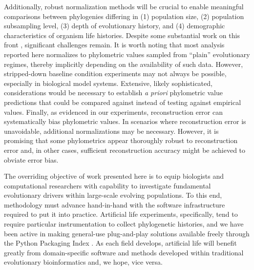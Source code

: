 Additionally, robust normalization methods will be crucial to enable meaningful comparisons between phylogenies differing in (1) population size, (2) population subsampling level, (3) depth of evolutionary history, and (4) demographic characteristics of organism life histories.
Despite some substantial work on this front \citep{shao1990tree,mir2018sound}, significant challenges remain.
It is worth noting that most analysis reported here normalizes to phylometric values sampled from ``plain'' evolutionary regimes, thereby implicitly depending on the availability of such data.
However, stripped-down baseline condition experiments may not always be possible, especially in biological model systems.
Extensive, likely sophisticated, considerations would be necessary to establish \textit{a priori} phylometric value predictions that could be compared against instead of testing against empirical values.
Finally, as evidenced in our experiments, reconstruction error can systematically bias phylometric values.
In scenarios where reconstruction error is unavoidable, additional normalizations may be necessary.
However, it is promising that some phylometrics appear thoroughly robust to reconstruction error and, in other cases, sufficient reconstruction accuracy might be achieved to obviate error bias.

The overriding objective of work presented here is to equip biologists and computational researchers with capability to investigate fundamental evolutionary drivers within large-scale evolving populations.
To this end, methodology must advance hand-in-hand with the software infrastructure required to put it into practice.
Artificial life experiments, specifically, tend to require particular instrumentation to collect phylogenetic histories, and we have been active in making general-use plug-and-play solutions available freely through the Python Packaging Index \citep{moreno2022hstrat,dolson2024phylotrackpy}.
As each field develops, artificial life will benefit greatly from domain-specific software and methods developed within traditional evolutionary bioinformatics and, we hope, vice versa.



